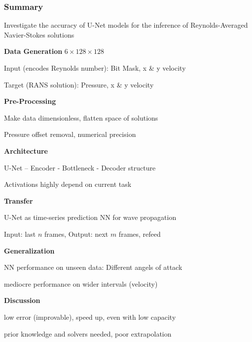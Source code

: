 \begin{frame}
    \frametitle{Summary}
	\vspace*{0.8cm}
Investigate the accuracy of U-Net models for the inference of Reynolds-Averaged Navier-Stokes solutions

\begin{multicols}{2}
    \textbf{Data Generation} $6 \times 128 \times 128$
	\begin{PraesentationAufzaehlung}
		\item Input (encodes Reynolds number): Bit Mask, x \& y velocity
		\item Target (RANS solution): Pressure, x \& y velocity
	\end{PraesentationAufzaehlung}
	
	\textbf{Pre-Processing}
	\begin{PraesentationAufzaehlung}
		\item Make data dimensionless, flatten space of solutions
		\item Pressure offset removal, numerical precision
	\end{PraesentationAufzaehlung}
	
	\textbf{Architecture}
	\begin{PraesentationAufzaehlung}
		\item U-Net -- Encoder - Bottleneck - Decoder structure
		\item Activations highly depend on current task
	\end{PraesentationAufzaehlung}
	
    \vfill\columnbreak
    \textbf{Transfer} 
	\begin{PraesentationAufzaehlung}
		\item U-Net as time-series prediction NN for wave propagation
		\item Input: last $n$ frames, Output: next $m$ frames, refeed
	\end{PraesentationAufzaehlung}
	
	\textbf{Generalization}
	\begin{PraesentationAufzaehlung}
		\item NN performance on unseen data: Different angels of attack
		\item mediocre performance on wider intervals (velocity)
	\end{PraesentationAufzaehlung}
	
	\textbf{Discussion}
	\begin{PraesentationAufzaehlung}
		\item low error (improvable), speed up, even with low capacity  
		\item prior knowledge and solvers needed, poor extrapolation
	\end{PraesentationAufzaehlung}
	
\end{multicols}
\end{frame}
\clearpage